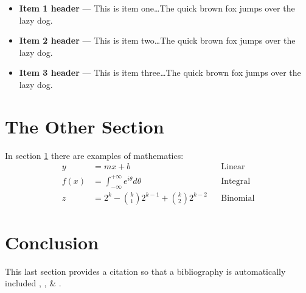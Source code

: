 \documentclass[11pt,twocolumn]{article}%
\numberwithin{equation}{section}%
\begin{document}
\begin{itemize}
\item {\bf Item 1 header} --- This is item one\dots The quick brown fox jumps
over the lazy dog.
\item {\bf Item 2 header} --- This is item two\dots The quick brown fox jumps
over the lazy dog.
\item {\bf Item 3 header} --- This is item three\dots The quick brown fox jumps
over the lazy dog.
\end{itemize}

\section{The Other Section}
\label{The Other Section}

In section \ref{The Other Section} there are examples of
mathematics:\begin{align}
y &= mx+b && \text{Linear} \\
f(x) &= \int_{-\infty}^{+\infty} e^{i\theta} d\theta && \text{Integral} \\
z &= 2^k-\binom{k}{1}2^{k-1}+\binom{k}{2}2^{k-2} &&\text{Binomial}
\end{align}

\section{Conclusion}
\label{Conclusion}

This last section provides a citation so that a bibliography is
automatically included \cite{book:knr}, \cite{book:middlemarch}, \&
\cite{book:engines-of-logic}.


\end{document}
